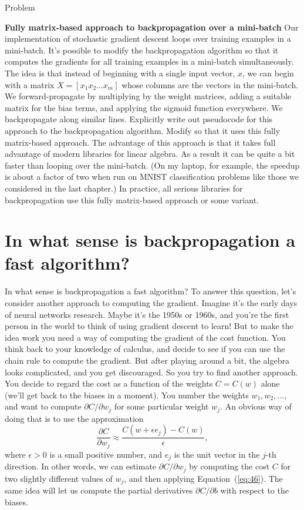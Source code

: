 \documentclass[a4paper,twoside,10pt]{book}
\begin{document}
\begin{exercize}{Problem}
\label{backprop_over_minibatch}
\item \textbf{Fully matrix-based approach to backpropagation over a mini-batch} Our implementation of stochastic gradient descent loops over training examples in a mini-batch. It's possible to modify the backpropagation algorithm so that it computes the gradients for all training examples in a mini-batch simultaneously. The idea is that instead of beginning with a single input vector, $x$, we can begin with a matrix $X=[x_1x_2\ldots{}x_m]$ whose columns are the vectors in the mini-batch. We forward-propagate by multiplying by the weight matrices, adding a suitable matrix for the bias terms, and applying the sigmoid function everywhere. We backpropagate along similar lines. Explicitly write out pseudocode for this approach to the backpropagation algorithm. Modify  so that it uses this fully matrix-based approach. The advantage of this approach is that it takes full advantage of modern libraries for linear algebra. As a result it can be quite a bit faster than looping over the mini-batch. (On my laptop, for example, the speedup is about a factor of two when run on MNIST classification problems like those we considered in the last chapter.) In practice, all serious libraries for backpropagation use this fully matrix-based approach or some variant.
\end{exercize}
\section{In what sense is backpropagation a fast algorithm?}
\label{sec:2.8}
In what sense is backpropagation a fast algorithm? To answer this question, let's consider another approach to computing the gradient. Imagine it's the early days of neural networks research. Maybe it's the 1950s or 1960s, and you're the first person in the world to think of using gradient descent to learn! But to make the idea work you need a way of computing the gradient of the cost function. You think back to your knowledge of calculus, and decide to see if you can use the chain rule to compute the gradient. But after playing around a bit, the algebra looks complicated, and you get discouraged. So you try to find another approach. You decide to regard the cost as a function of the weights $C=C(w)$ alone (we'll get back to the biases in a moment). You number the weights $w_1,w_2,\ldots$, and want to compute $\partial{}C/\partial{}w_j$ for some particular weight $w_j$. An obvious way of doing that is to use the approximation
\begin{equation}
	\frac{\partial C}{\partial w_{j}} \approx \frac{C(w+\epsilon e_j)-C(w)}{\epsilon},
	\tag{46}\label{eq:46}
\end{equation}
where $\epsilon>0$ is a small positive number, and $e_j$ is the unit vector in the $j$-th direction. In other words, we can estimate $\partial{}C/\partial{}w_j$ by computing the cost $C$ for two slightly different values of $w_j$, and then applying Equation~(\ref{eq:46}). The same idea will let us compute the partial derivatives $\partial{}C/\partial{}b$ with respect to the biases.
\end{document}
